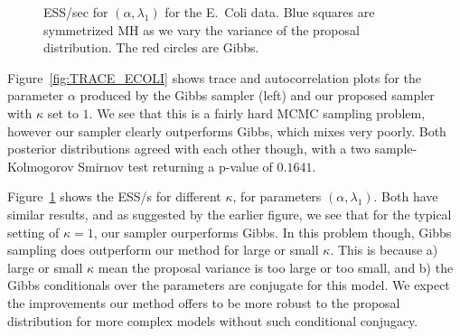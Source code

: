 \begin{figure}[]
\begin{minipage}[!hp]{.55\linewidth}
  \end{minipage}  
  \begin{minipage}[!hp]{.01\linewidth}
  \end{minipage}
  \begin{minipage}[!hp]{.38\linewidth}
    \caption{ESS/sec for $(\alpha,\lambda_1)$ for the E.\ Coli data. 
      Blue squares are symmetrized MH as we vary the variance of the proposal distribution. 
      The red circles are Gibbs. }
     \label{fig:ECOLI}
  \end{minipage}  
\vspace{-.2in}
  \end{figure}

  Figure~\ref{fig:TRACE_ECOLI} shows trace and autocorrelation plots for the parameter $\alpha$ produced by the Gibbs sampler (left) and our proposed sampler with $\kappa$ set to $1$.
  We see that this is a fairly hard MCMC sampling problem, however our sampler clearly outperforms Gibbs, which mixes very poorly.
  Both posterior distributions agreed with each other though, with a two sample-Kolmogorov Smirnov test returning a p-value of $ 0.1641$. 
  
  Figure~\ref{fig:ECOLI} shows the ESS/s for different $\kappa$, for parameters $(\alpha, \lambda_1)$. 
  Both have similar results, and as suggested by the earlier figure, we see that for the typical setting of $\kappa=1$, our sampler ourperforms Gibbs. 
  In this problem though, Gibbs sampling does outperform our method for large or small $\kappa$. 
  This is because a) large or small $\kappa$ mean the proposal variance is too large or too small, and b) the Gibbs conditionals over the parameters are conjugate for this model. 
  We expect the improvements our method offers to be more robust to the proposal distribution for more complex models without such conditional conjugacy.



